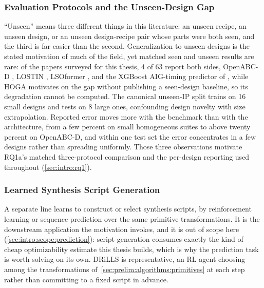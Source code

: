 \subsubsection{Evaluation Protocols and the Unseen-Design Gap}
\label{sec:relwork:ml4eda:protocols}
``Unseen'' means three different things in this literature: an unseen recipe, an unseen
design, or an unseen design-recipe pair whose parts were both seen, and the third is far
easier than the second. Generalization to unseen designs is the stated motivation of much
of the field, yet matched seen and unseen results are rare: of the papers surveyed for
this thesis, 4 of 63 report both sides, OpenABC-D \citep{chowdhury2021openabc}, LOSTIN
\citep{wu2022lostin}, LSOformer \citep{karimi2024lsoformer}, and the XGBoost AIG-timing
predictor of \citet{jiang2025aigtiming}, while HOGA \citep{deng2024hoga} motivates on the
gap without publishing a seen-design baseline, so its degradation cannot be computed.
The canonical unseen-IP split trains on 16 small designs and tests on 8 large ones,
confounding design novelty with size extrapolation. Reported error moves more with the
benchmark than with the architecture, from a few percent on small homogeneous suites to
above twenty percent on OpenABC-D, and within one test set the error concentrates in a
few designs rather than spreading uniformly. Those three observations motivate RQ1a's
matched three-protocol comparison and the per-design reporting used throughout
(\ref{sec:intro:rq1}).

\subsubsection{Learned Synthesis Script Generation}
\label{sec:relwork:ml4eda:scripts}
A separate line learns to construct or select synthesis scripts, by reinforcement
learning or sequence prediction over the same primitive transformations. It is the
downstream application the motivation invokes, and it is out of scope here
(\ref{sec:intro:scope:prediction}): script generation consumes exactly the kind of cheap
optimizability estimate this thesis builds, which is why the prediction task is worth
solving on its own. DRiLLS \citep{hosny2020drills} is representative, an RL agent
choosing among the transformations of~\ref{sec:prelim:algorithms:primitives} at each
step rather than committing to a fixed script in advance.

